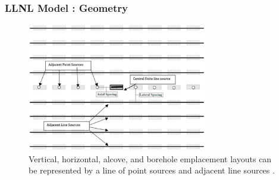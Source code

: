 \begin{frame}
  \frametitle{LLNL Model : Geometry}
  \begin{figure}[h!]
    \begin{center}
      \includegraphics[width=0.7\textwidth]{llnlConcept.eps}
    \end{center}
    \caption{Vertical, horizontal, alcove, and borehole emplacement layouts can 
    be represented by a line of point sources and adjacent line sources 
    \cite{greenberg_thermal_2011}.}
    \label{fig:llnl}
  \end{figure}
\end{frame}


